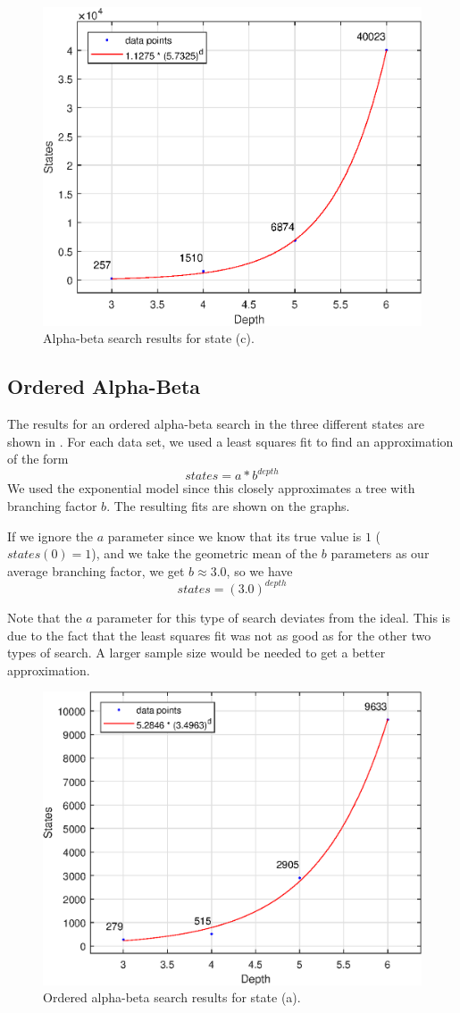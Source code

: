 \documentclass[journal,hidelinks]{IEEEtran}
\begin{document}
\begin{figure}[!htb]
  \centering
  \includegraphics[width=0.6\columnwidth]{state-3/alpha-beta.eps}
  \caption{Alpha-beta search results for state (c).}
  \label{fig:state-3-alpha-beta}
\end{figure}

\subsection{Ordered Alpha-Beta}

The results for an ordered alpha-beta search in the three different states are shown in . For each data set, we used a least squares fit to find an approximation of the form
\[
states = a * b^{depth}
\]
We used the exponential model since this closely approximates a tree with branching factor $b$. The resulting fits are shown on the graphs.

If we ignore the $a$ parameter since we know that its true value is $1$ ($states(0) = 1$), and we take the geometric mean of the $b$ parameters as our average branching factor, we get $b \approx 3.0$, so we have
\[
states = (3.0)^{depth}
\]

Note that the $a$ parameter for this type of search deviates from the ideal. This is due to the fact that the least squares fit was not as good as for the other two types of search. A larger sample size would be needed to get a better approximation.

\begin{figure}[!htb]
  \centering
  \includegraphics[width=0.6\columnwidth]{state-1/ordered-alpha-beta.eps}
  \caption{Ordered alpha-beta search results for state (a).}
  \label{fig:state-1-ordered-alpha-beta}
\end{figure}
\end{document}
